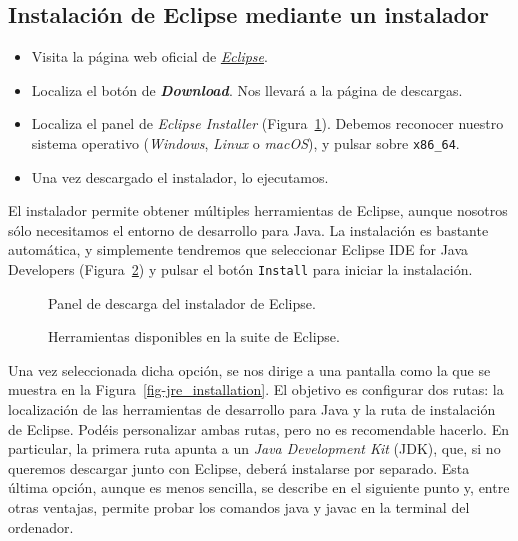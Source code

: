 \documentclass[
  spanish,
  11pt,
  a4paper,
  DIV=11,
  numbers=noendperiod]{scrartcl}
\providecommand{\tightlist}{%
  \setlength{\itemsep}{0pt}\setlength{\parskip}{0pt}}
\begin{document}
\subsection{Instalación de Eclipse mediante un instalador}\label{instalaciuxf3n-de-eclipse-mediante-un-instalador}

\begin{itemize}
\tightlist
\item
 Visita la página web oficial de \href{https://www.eclipse.org/}{\emph{Eclipse}}.
\item
 Localiza el botón de \textbf{\emph{Download}}. Nos llevará a la página de descargas.
\item
 Localiza el panel de \emph{Eclipse Installer} (Figura~\ref{fig-installer}). Debemos reconocer nuestro sistema operativo (\emph{Windows}, \emph{Linux} o \emph{macOS}), y pulsar sobre \texttt{x86\_64}.
\item
 Una vez descargado el instalador, lo ejecutamos.
\end{itemize}

El instalador permite obtener múltiples herramientas de Eclipse, aunque nosotros sólo necesitamos el entorno de desarrollo para Java. La instalación es bastante automática, y simplemente tendremos que seleccionar Eclipse IDE for Java Developers (Figura~\ref{fig-suite_tools}) y pulsar el botón \texttt{Install} para iniciar la instalación.

\begin{figure}
\caption{Panel de descarga del instalador de Eclipse.}\label{fig-installer}
\end{figure}

\begin{figure}
\caption{Herramientas disponibles en la suite de Eclipse.}\label{fig-suite_tools}
\end{figure}

Una vez seleccionada dicha opción, se nos dirige a una pantalla como la que se muestra en la Figura~\ref{fig-jre_installation}. El objetivo es configurar dos rutas: la localización de las herramientas de desarrollo para Java y la ruta de instalación de Eclipse. Podéis personalizar ambas rutas, pero no es recomendable hacerlo. En particular, la primera ruta apunta a un \emph{Java Development Kit} (JDK), que, si no queremos descargar junto con Eclipse, deberá instalarse por separado. Esta última opción, aunque es menos sencilla, se describe en el siguiente punto y, entre otras ventajas, permite probar los comandos java y javac en la terminal del ordenador.
\end{document}
